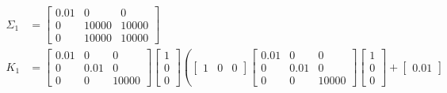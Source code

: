 \documentclass[answers]{exam}
\begin{document}
\begin{questions}
\begin{parts}
\begin{solution}
            \begin{align*}
                \Sigma_1 & = \begin{bmatrix}
                                 0.01 & 0     & 0     \\
                                 0    & 10000 & 10000 \\
                                 0    & 10000 & 10000
                             \end{bmatrix}                                                                                    \\
                K_1      & = \begin{bmatrix}
                                 0.01 & 0    & 0     \\
                                 0    & 0.01 & 0     \\
                                 0    & 0    & 10000
                             \end{bmatrix} \begin{bmatrix}
                                               1 \\ 0 \\ 0
                                           \end{bmatrix} \left(\begin{bmatrix}
                                                                   1 & 0 & 0
                                                               \end{bmatrix} \begin{bmatrix}
                                                                                 0.01 & 0    & 0     \\
                                                                                 0    & 0.01 & 0     \\
                                                                                 0    & 0    & 10000
                                                                             \end{bmatrix} \begin{bmatrix}
                                                                                               1 \\ 0 \\ 0
                                                                                           \end{bmatrix} + \begin{bmatrix}
                                                                                                               0.01

\end{bmatrix}
\end{align*}
\end{solution}
\end{parts}
\end{questions}
\end{document}

